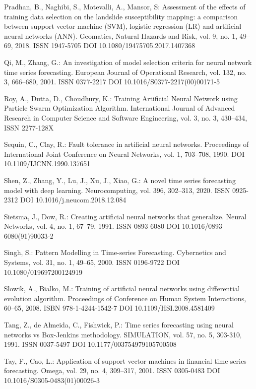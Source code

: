 \begin{thebibliography}{99.}
 Pradhan, B., Naghibi, S., Motevalli, A., Mansor, S: Assessment of the effects of training data selection on the landslide susceptibility mapping: a comparison between support vector machine (SVM), logistic regression (LR) and artificial neural networks (ANN). Geomatics, Natural Hazards and Risk, vol. 9, no. 1, 49--69, 2018. ISSN 1947-5705 DOI 10.1080/19475705.2017.1407368

 Qi, M., Zhang, G.: An investigation of model selection criteria for neural network time series forecasting. European Journal of Operational Research, vol. 132, no. 3, 666--680, 2001. ISSN 0377-2217 DOI 10.1016/S0377-2217(00)00171-5

 Roy, A., Dutta, D., Choudhury, K.: Training Artificial Neural Network using Particle Swarm Optimization Algorithm. International Journal of Advanced Research in Computer Science and Software Engineering, vol. 3, no. 3, 430--434, ISSN 2277-128X

 Sequin, C., Clay, R.: Fault tolerance in artificial neural networks. Proceedings of International Joint Conference on Neural Networks, vol. 1, 703--708, 1990. DOI 10.1109/IJCNN.1990.137651

 Shen, Z., Zhang, Y., Lu, J., Xu, J., Xiao, G.: A novel time series forecasting model with deep learning. Neurocomputing, vol. 396, 302--313, 2020. ISSN 0925-2312 DOI 10.1016/j.neucom.2018.12.084

 Sietsma, J., Dow, R.: Creating artificial neural networks that generalize. Neural Networks, vol. 4, no. 1, 67--79, 1991. ISSN 0893-6080 DOI 10.1016/0893-6080(91)90033-2

 Singh, S.: Pattern Modelling in Time-series Forecasting. Cybernetics and Systems, vol. 31, no. 1, 49--65, 2000. ISSN 0196-9722 DOI 10.1080/019697200124919

 Slowik, A., Bialko, M.: Training of artificial neural networks using differential evolution algorithm. Proceedings of Conference on Human System Interactions, 60--65, 2008. ISBN 978-1-4244-1542-7 DOI 10.1109/HSI.2008.4581409

 Tang, Z., de Almeida, C., Fishwick, P.: Time series forecasting using neural networks vs Box-Jenkins methodology. SIMULATION, vol. 57, no. 5, 303-310, 1991. ISSN 0037-5497 DOI 10.1177/003754979105700508

 Tay, F., Cao, L.: Application of support vector machines in financial time series forecasting. Omega, vol. 29, no. 4, 309--317, 2001. ISSN 0305-0483 DOI 10.1016/S0305-0483(01)00026-3


\end{thebibliography}
